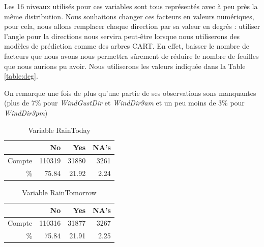 \documentclass{article}
\begin{document}
Les 16 niveaux utilisés pour ces variables sont tous représentés avec à peu près la même distribution. Nous souhaitons changer ces facteurs en valeurs numériques, pour cela, nous allons remplacer chaque direction par sa valeur en degrés : utiliser l'angle pour la directions nous servira peut-être lorsque nous utiliserons des modèles de prédiction comme des arbres CART. En effet, baisser le nombre de facteurs que nous avons nous permettra sûrement de réduire le nombre de feuilles que nous aurions pu avoir. Nous utiliserons les valeurs indiquée dans la Table \ref{table:deg}.

\begin{table}[H]
    \centering
    \caption{Les 16 points cardinaux en degrés}
    \label{table:deg}
\end{table}

On remarque une fois de plus qu'une partie de ses observations sons manquantes (plus de 7\% pour \emph{WindGustDir} et \emph{WindDir9am} et un peu moins de 3\% pour \emph{WindDir3pm})


\begin{table}[p]
    \centering
    \begin{tabular}{|r||rrr|}
        \hline
        &    No &    Yes &   NA's \\
        \hline
        \hline
        Compte & 110319 &  31880 &   3261 \\
        \% & 75.84 & 21.92 & 2.24 \\
        \hline
    \end{tabular}
    \caption{Variable RainToday}
    \label{table:rain_today}
\end{table}

\begin{table}[p]
    \centering
    \begin{tabular}{|r||rrr|}
        \hline
        &    No &    Yes &   NA's \\
        \hline
        \hline
        Compte & 110316 &  31877 &   3267 \\
        \% & 75.84 & 21.91 & 2.25 \\
        \hline
    \end{tabular}
    \caption{Variable RainTomorrow}
    \label{table:rain_tomorrow}
\end{table}
\end{document}
